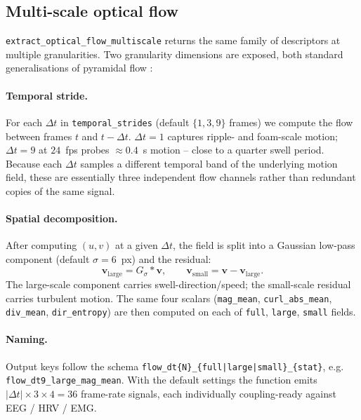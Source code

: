 \documentclass[11pt,a4paper]{article}
\newcommand{\code}[1]{\texttt{\small #1}}
\begin{document}
\subsection{Multi-scale optical flow}\label{sec:flow-multiscale}

\code{extract\_optical\_flow\_multiscale} returns the same family of
descriptors at multiple granularities. Two granularity dimensions are
exposed, both standard generalisations of pyramidal flow
\citep{bouguet2001,zach2007}:

\paragraph{Temporal stride.} For each $\Delta t$ in
\code{temporal\_strides} (default $\{1, 3, 9\}$ frames) we compute the
flow between frames $t$ and $t-\Delta t$. $\Delta t = 1$ captures
ripple- and foam-scale motion; $\Delta t = 9$ at $24$~fps probes
$\approx 0.4$~s motion -- close to a quarter swell period. Because each
$\Delta t$ samples a different temporal band of the underlying motion
field, these are essentially three independent flow channels rather
than redundant copies of the same signal.

\paragraph{Spatial decomposition.} After computing $(u, v)$ at a given
$\Delta t$, the field is split into a Gaussian low-pass component
(default $\sigma = 6$~px) and the residual:
\begin{equation}
  \mathbf{v}_{\text{large}} = G_\sigma \ast \mathbf{v},\qquad
  \mathbf{v}_{\text{small}} = \mathbf{v} - \mathbf{v}_{\text{large}}.
\end{equation}
The large-scale component carries swell-direction/speed; the small-scale
residual carries turbulent motion. The same four scalars
(\code{mag\_mean}, \code{curl\_abs\_mean}, \code{div\_mean},
\code{dir\_entropy}) are then computed on each of \texttt{full},
\texttt{large}, \texttt{small} fields.

\paragraph{Naming.} Output keys follow the schema
\code{flow\_dt\{N\}\_\{full|large|small\}\_\{stat\}}, e.g.
\code{flow\_dt9\_large\_mag\_mean}. With the default settings the
function emits $|\Delta t| \times 3 \times 4 = 36$ frame-rate signals,
each individually coupling-ready against EEG / HRV / EMG.
\end{document}
